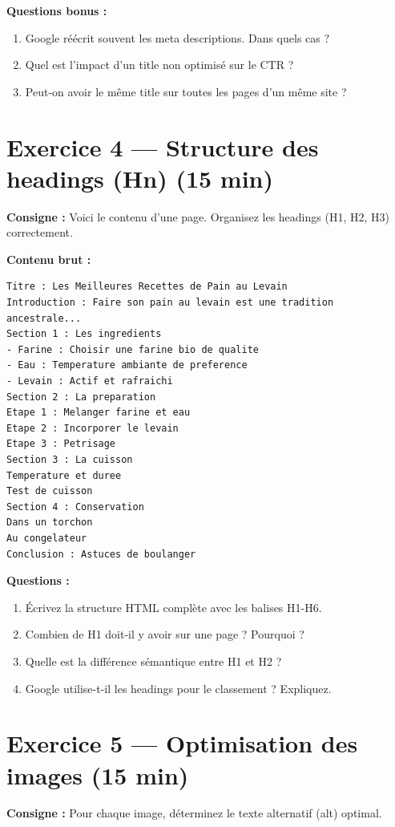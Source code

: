 \documentclass[12pt,a4paper]{report}
\begin{document}
\textbf{Questions bonus :}
\begin{enumerate}
    \item Google r\'{e}\'{e}crit souvent les meta descriptions. Dans quels cas ?
    \item Quel est l'impact d'un title non optimis\'{e} sur le CTR ?
    \item Peut-on avoir le m\^{e}me title sur toutes les pages d'un m\^{e}me site ?
\end{enumerate}

\section{Exercice 4 --- Structure des headings (Hn) (15 min)}

\textbf{Consigne :} Voici le contenu d'une page. Organisez les headings (H1, H2, H3) correctement.

\textbf{Contenu brut :}
\begin{lstlisting}
Titre : Les Meilleures Recettes de Pain au Levain
Introduction : Faire son pain au levain est une tradition ancestrale...
Section 1 : Les ingredients
- Farine : Choisir une farine bio de qualite
- Eau : Temperature ambiante de preference
- Levain : Actif et rafraichi
Section 2 : La preparation
Etape 1 : Melanger farine et eau
Etape 2 : Incorporer le levain
Etape 3 : Petrisage
Section 3 : La cuisson
Temperature et duree
Test de cuisson
Section 4 : Conservation
Dans un torchon
Au congelateur
Conclusion : Astuces de boulanger
\end{lstlisting}

\textbf{Questions :}
\begin{enumerate}
    \item \'{E}crivez la structure HTML compl\`{e}te avec les balises H1-H6.
    \item Combien de H1 doit-il y avoir sur une page ? Pourquoi ?
    \item Quelle est la diff\'{e}rence s\'{e}mantique entre H1 et H2 ?
    \item Google utilise-t-il les headings pour le classement ? Expliquez.
\end{enumerate}

\section{Exercice 5 --- Optimisation des images (15 min)}

\textbf{Consigne :} Pour chaque image, d\'{e}terminez le texte alternatif (alt) optimal.
\end{document}
